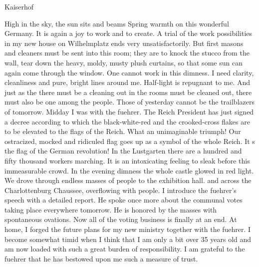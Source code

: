 Kaiserhof

High in the sky, the sun sits and beams Spring warmth on this wonderful Germany. It is again a joy to work and to create. A trial of the work possibilities in my new house on Wilhelmplatz ends very unsatisfactorily. But first masons and cleaners must be sent into this room; they are to knock the stucco from the wall, tear down the heavy, moldy, musty plush curtains, so that some sun can again come through the window. One cannot work in this dimness. I need clarity, cleanliness and pure, bright lines around me. Half-light is repugnant to me. And just as the there must be a cleaning out in the rooms must be cleaned out, there must also be one among the people. Those of yesterday cannot be the trailblazers of tomorrow. Midday I was with the fuehrer. The Reich President has just signed a decree according to which the black-white-red and the crooked-cross flakes are to be elevated to the flags of the Reich. What an unimaginable triumph! Our ostracized, mocked and ridiculed flag goes up as a symbol of the whole Reich. It s the flag of the German revolution! In the Lustgarten there are a hundred and fifty thousand workers marching. It is an intoxicating feeling to sleak before this immeasurable crowd. In the evening dimness the whole castle glowed in red light. We drove through endless masses of people to the exhibition hall.  and across the Charlottenburg Chaussee, overflowing with people. I introduce the fuehrer's speech with a detailed report. He spoke once more about the communal votes taking place everywhere tomorrow. He is honored by the masses with spontaneous ovations. Now all of the voting business is finally at an end. At home, I forged the future plans for my new ministry together with the fuehrer. I become somewhat timid when I think that I am only a bit over 35 years old and am now loaded with such a great burden of responsibility. I am grateful to the fuehrer that he has bestowed upon me such a measure of trust.
